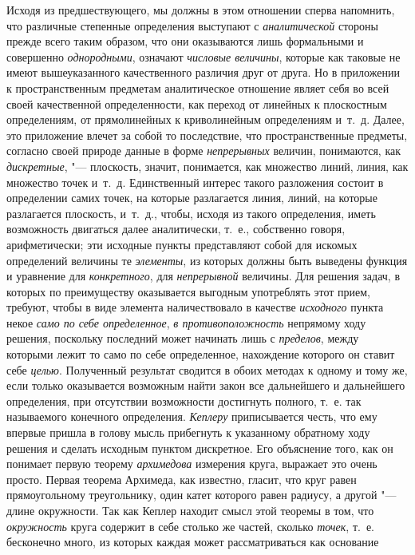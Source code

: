 Исходя из предшествующего, мы должны в этом отношении сперва напомнить, что
различные степенные определения выступают с
{\em аналитической} стороны прежде всего таким образом,
что они оказываются лишь формальными и совершенно {\em однородными}, означают
{\em числовые величины}, которые как таковые не имеют
вышеуказанного качественного различия друг от друга. Но в приложении к
пространственным предметам аналитическое отношение являет себя во всей
своей качественной определенности, как переход от линейных к плоскостным
определениям, от прямолинейных к криволинейным определениям и~т.~д. Далее,
это приложение влечет за собой то последствие, что пространственные
предметы, согласно своей природе данные в форме
{\em непрерывных} величин, понимаются, как
{\em дискретные}, "--- плоскость, значит, понимается, как
множество линий, линия, как множество точек и~т.~д. Единственный интерес
такого разложения состоит в определении самих точек, на которые разлагается
линия, линий, на которые разлагается плоскость, и~т.~д., чтобы, исходя из
такого определения, иметь возможность двигаться далее аналитически, т.~е.,
собственно говоря, арифметически; эти исходные пункты представляют собой
для искомых определений величины те {\em элементы}, из
которых должны быть выведены функция и уравнение для
{\em конкретного}, для {\em непрерывной} величины. Для решения задач, в
которых по преимуществу оказывается выгодным употреблять этот прием,
требуют, чтобы в виде элемента наличествовало в качестве
{\em исходного} пункта некое {\em само по себе определенное},
{\em в противоположность} непрямому ходу решения,
поскольку последний может начинать лишь с
{\em пределов}, между которыми лежит то само по себе
определенное, нахождение которого он ставит себе
{\em целью}. Полученный результат сводится в обоих
методах к одному и тому же, если только оказывается возможным найти закон
все дальнейшего и дальнейшего определения, при отсутствии возможности
достигнуть полного, т.~е. так называемого конечного определения.
{\em Кеплеру} приписывается честь, что ему впервые
пришла в голову мысль прибегнуть к указанному обратному ходу решения и
сделать исходным пунктом дискретное. Его объяснение того, как он понимает
первую теорему {\em архимедова} измерения круга,
выражает это очень просто. Первая теорема Архимеда, как известно, гласит,
что круг равен прямоугольному треугольнику, один катет которого равен
радиусу, а другой "--- длине окружности. Так как Кеплер находит смысл этой
теоремы в том, что {\em окружность} круга содержит в
себе столько же частей, сколько {\em точек}, т.~е.
бесконечно много, из которых каждая может рассматриваться как основание
